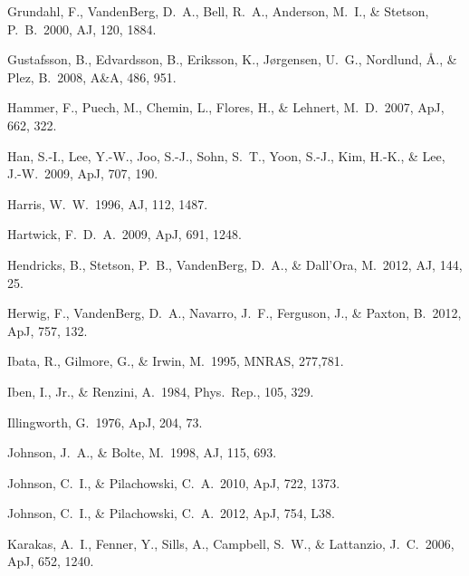 \documentclass[12pt,preprint]{aastex}
\begin{document}
\begin{thebibliography}{}

Grundahl, F., VandenBerg, D.~A., Bell, R.~A., Anderson, M.~I., \& Stetson,
 P.~B.~2000, AJ, 120, 1884.

Gustafsson, B., Edvardsson, B., Eriksson, K., J{\o}rgensen, U.~G., Nordlund,
 {\AA}., \& Plez, B.~2008, A\&A, 486, 951.


Hammer, F., Puech, M., Chemin, L., Flores, H., \& Lehnert, M.~D.~2007, ApJ,
 662, 322.

Han, S.-I., Lee, Y.-W., Joo, S.-J., Sohn, S.~T., Yoon, S.-J., Kim, H.-K., \&
 Lee, J.-W.~2009, ApJ, 707, 190.

Harris, W.~W.~1996, AJ, 112, 1487.

Hartwick, F.~D.~A.~2009, ApJ, 691, 1248.

Hendricks, B., Stetson, P.~B., VandenBerg, D.~A., \& Dall'Ora, M.~2012, AJ,
 144, 25.

Herwig, F., VandenBerg, D.~A., Navarro, J.~F., Ferguson, J., \& Paxton,
 B.~2012, ApJ, 757, 132.

Ibata, R., Gilmore, G., \& Irwin, M.~1995, MNRAS, 277,781.

Iben, I., Jr., \& Renzini, A.~1984, Phys.~Rep., 105, 329.

Illingworth, G.~1976, ApJ, 204, 73.

Johnson, J.~A., \& Bolte, M.~1998, AJ, 115, 693.

Johnson, C.~I., \& Pilachowski, C.~A.~2010, ApJ, 722, 1373.

Johnson, C.~I., \& Pilachowski, C.~A.~2012, ApJ, 754, L38.

Karakas, A.~I., Fenner, Y., Sills, A., Campbell, S.~W., \& Lattanzio, 
 J.~C.~2006, ApJ, 652, 1240.


\end{thebibliography}
\end{document}
